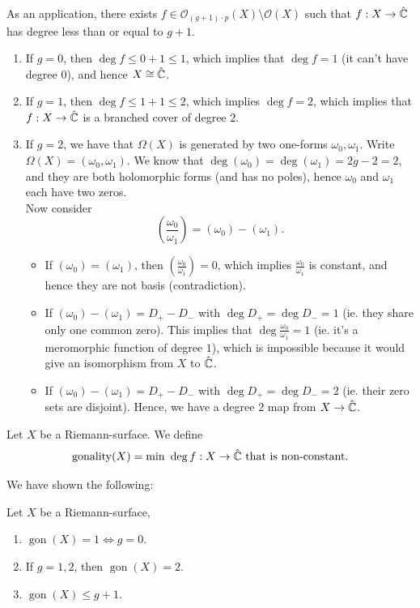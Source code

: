 \documentclass{article}
\begin{document}
{\begin{corollary}
        As an application, there exists $f \in \mathcal{O}_{(g+1) \cdot p}(X) \setminus \mathcal{O}(X)$ such that $f: X \to \hat{\mathbb{C}}$ has degree less than or equal to $g + 1$.
\end{corollary}

\begin{enumerate}
    \item If $g = 0$, then $\deg f \leq 0 + 1 \leq 1$, which implies that $\deg f = 1$ (it can't have degree $0$), and hence $X \cong \hat{\mathbb{C}}$.
    \item If $g = 1$, then $\deg f \leq 1 + 1 \leq 2$, which implies $\deg f = 2$, which implies that $f: X \to \hat{\mathbb{C}}$ is a branched cover of degree $2$.
    \item If $g = 2$, we have that $\Omega(X)$ is generated by two one-forms $\omega_0, \omega_1$. Write $\Omega(X) = (\omega_0, \omega_1)$. We know that $\deg(\omega_0) = \deg(\omega_1) = 2g - 2 = 2$, and they are both holomorphic forms (and has no poles), hence $\omega_0$ and $\omega_1$ each have two zeros.\\

    Now consider
    \[(\frac{\omega_0}{\omega_1}) = (\omega_0) - (\omega_1).\]
\begin{itemize}
    \item If $(\omega_0) = (\omega_1)$, then $(\frac{\omega_0}{\omega_1}) = 0$, which implies $\frac{\omega_0}{\omega_1}$ is constant, and hence they are not basis (contradiction).
    \item If $(\omega_0) - (\omega_1) = D_+ - D_-$ with $\deg D_+ = \deg D_- = 1$ (ie. they share only one common zero). This implies that $\deg \frac{\omega_0}{\omega_1} = 1$ (ie. it's a meromorphic function of degree $1$), which is impossible because it would give an isomorphism from $X$ to $\hat{\mathbb{C}}$.
    \item If $(\omega_0) - (\omega_1) = D_+ - D_-$ with $\deg D_+ = \deg D_- = 2$ (ie. their zero sets are disjoint). Hence, we have a degree $2$ map from $X \to \hat{\mathbb{C}}$.
\end{itemize}
\end{enumerate}

\begin{definition}
    Let $X$ be a Riemann-surface. We define
    \[\operatorname{gonality}(X) = \min\ \deg f: X \to \hat{\mathbb{C}} \text{ that is non-constant}.\]
\end{definition}

We have shown the following:
\begin{proposition}
Let $X$ be a Riemann-surface,
\begin{enumerate}
    \item $\operatorname{gon}(X) = 1 \iff g = 0$.
    \item If $g = 1, 2$, then $\operatorname{gon}(X) = 2$.
    \item $\operatorname{gon}(X) \leq g + 1$.
\end{enumerate}
\end{proposition}

}
\end{document}
